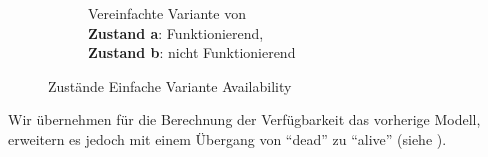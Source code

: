 \documentclass[
            a4paper
            ]{scrartcl}%
\begin{document}
\begin{figure}
\begin{subfigure}[b]{0.48\linewidth}
            \caption{Vereinfachte Variante von  \\
                \textbf{Zustand a}: Funktionierend, \\
                \textbf{Zustand b}: nicht Funktionierend}
            \label{fig:states_simple_avail_simply}
    \end{subfigure}
    \caption{Zustände Einfache Variante Availability}
    \label{fig:states_simple_avail_comb}
\end{figure}
Wir übernehmen für die Berechnung der Verfügbarkeit das vorherige Modell,
erweitern es jedoch mit einem Übergang von \enquote{dead} zu \enquote{alive}
(siehe ).
\end{document}
